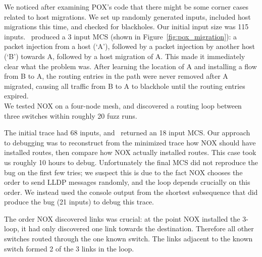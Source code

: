  We noticed after examining POX's code
that there might be some corner cases related to host migrations.
We set up randomly generated inputs, included host
migrations this time, and checked for blackholes. Our initial input size was
115 inputs.
\projectname~produced a 3 input MCS (shown
in Figure~\ref{fig:pox_migration}): a packet injection from a
host (`A'), followed
by a packet injection by another host (`B') towards A, followed by a host migration of A. This made it immediately
clear what the problem was. After learning the location of A and installing a
flow from B to A, the routing entries in the path were never removed after A
migrated, causing all traffic from B to A to blackhole until the routing
entries expired.\\[0.5ex]
\setlength{\parskip}{0mm plus 0mm minus 1mm}
 We tested NOX on a four-node mesh, and discovered a
routing loop between three switches within
roughly 20 fuzz runs.

The initial trace had 68 inputs, and
\projectname~returned an 18 input MCS.
Our approach to debugging was to
reconstruct from the minimized trace how NOX should have installed routes, then compare
how NOX actually installed routes. This case took us roughly 10 hours to debug. Unfortunately the final MCS did
not reproduce the bug on the first few tries; we suspect this is due to the fact
NOX chooses the order to send LLDP messages randomly, and the loop depends
crucially on this order. We instead used the console output from the shortest
subsequence that did produce the bug (21 inputs) to debug this trace.

The order NOX discovered links was crucial: at the point NOX
installed the 3-loop, it had only discovered one link towards the destination.
Therefore all other switches routed through the one known switch. The
links adjacent to the known switch formed 2 of the 3 links in the loop.

